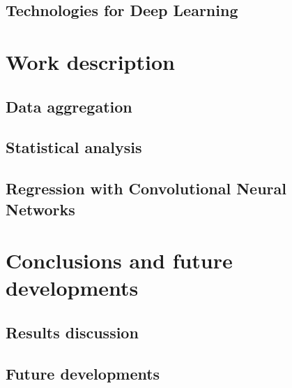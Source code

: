 \documentclass[11pt,a4paper,titlepage]{book}
\begin{document}
\section{Technologies for Deep Learning}

\chapter{Work description}
\section{Data aggregation}
\section{Statistical analysis}
\section{Regression with Convolutional Neural Networks}

\chapter{Conclusions and future developments}
\section{Results discussion}
\section{Future developments}

\printbibliography[heading=bibintoc,title={Bibliography}]
\end{document}
